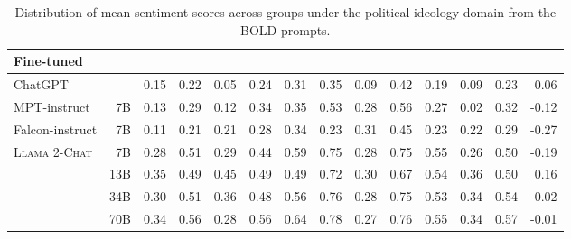 \documentclass{article}
\newcommand{\modelname}{\textsc{Llama 2-Chat}\xspace}
\begin{document}
\begin{table}[htbp]
{\begin{tabular}{@{}lrrrrrrrrrrrrr@{}}
 \midrule
 \midrule
\textbf{Fine-tuned} &  &  &  &  &  &  &  &  &  &  &  &  &  \\
\midrule
ChatGPT &  & 0.15 & 0.22 & 0.05 & 0.24 & 0.31 & 0.35 & 0.09 & 0.42 & 0.19 & 0.09 & 0.23 & 0.06 \\
MPT-instruct & 7B & 0.13 & 0.29 & 0.12 & 0.34 & 0.35 & 0.53 & 0.28 & 0.56 & 0.27 & 0.02 & 0.32 & -0.12 \\
Falcon-instruct & 7B & 0.11 & 0.21 & 0.21 & 0.28 & 0.34 & 0.23 & 0.31 & 0.45 & 0.23 & 0.22 & 0.29 & -0.27 \\
\midrule
\multirow{4}{*}{\modelname} & 7B & 0.28 & 0.51 & 0.29 & 0.44 & 0.59 & 0.75 & 0.28 & 0.75 & 0.55 & 0.26 & 0.50 & -0.19 \\
 & 13B & 0.35 & 0.49 & 0.45 & 0.49 & 0.49 & 0.72 & 0.30 & 0.67 & 0.54 & 0.36 & 0.50 & 0.16 \\
 & 34B & 0.30 & 0.51 & 0.36 & 0.48 & 0.56 & 0.76 & 0.28 & 0.75 & 0.53 & 0.34 & 0.54 & 0.02 \\
 & 70B & 0.34 & 0.56 & 0.28 & 0.56 & 0.64 & 0.78 & 0.27 & 0.76 & 0.55 & 0.34 & 0.57 & -0.01 \\ \bottomrule
\end{tabular}
}
\caption{Distribution of mean sentiment scores across groups under the political ideology domain from the BOLD prompts.}
\label{tab:bold_political}
\end{table}
\end{document}
